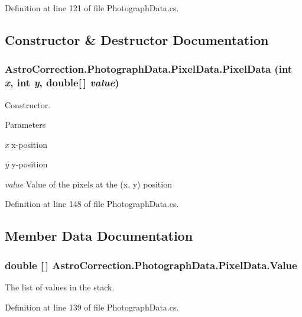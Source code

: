 Definition at line 121 of file PhotographData.cs.

\subsection{Constructor \& Destructor Documentation}
\subsubsection[{PixelData}]{\setlength{\rightskip}{0pt plus 5cm}AstroCorrection.PhotographData.PixelData.PixelData (int {\em x}, \/  int {\em y}, \/  double[$\,$] {\em value})}\label{struct_astro_correction_1_1_photograph_data_1_1_pixel_data_a11fe008afec5eab1135e058e75197059}


Constructor. 
\begin{DoxyParams}{Parameters}
\item[{\em x}]x-\/position \item[{\em y}]y-\/position \item[{\em value}]Value of the pixels at the (x, y) position \end{DoxyParams}


Definition at line 148 of file PhotographData.cs.

\subsection{Member Data Documentation}
\subsubsection[{Value}]{\setlength{\rightskip}{0pt plus 5cm}double [$\,$] {\bf AstroCorrection.PhotographData.PixelData.Value}}\label{struct_astro_correction_1_1_photograph_data_1_1_pixel_data_a4adc1767ab58c446ddf25930fcf96d55}


The list of values in the stack. 

Definition at line 139 of file PhotographData.cs.
